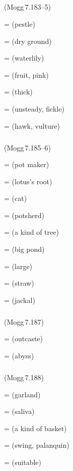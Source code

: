 \subparagraph*{} (Mogg\,7.183--5)\label{pacckx:kala}

 =  (pestle)\par
{} =  (dry ground)\par
{} =  (waterlily)\par
{} =  (fruit, pink)\par
{} =  (thick)\par
{} =  (unsteady, fickle)\par
{} =  (hawk, vulture)\par

\subparagraph*{} (Mogg\,7.185--6)\label{pacckx:kaala}

 =  (pot maker)\par
{} =  (lotus's root)\par
{} =  (cat)\par
{} =  (potsherd)\par
{} =  (a kind of tree)\par
{} =  (big pond)\par
{} =  (large)\par
{} =  (straw)\par
{} =  (jackal)\par

\subparagraph*{} (Mogg\,7.187)\label{pacckx:dnaala}

 =  (outcaste)\par
{} =  (abyss)\par

\subparagraph*{} (Mogg\,7.188)\label{pacckx:la2}

 =  (garland)\par
{} =  (saliva)\par
{} =  (a kind of basket)\par
{} =  (swing, palanquin)\par
{} =  (suitable)\par

